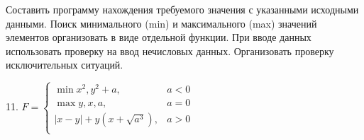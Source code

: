 Составить программу нахождения требуемого значения с указанными 
исходными данными. Поиск минимального (min) и максимального (max)
значений элементов организовать в виде отдельной функции.
При вводе данных использовать проверку на ввод нечисловых данных.
Организовать проверку исключительных ситуаций.

11.
$ 
	F = \begin{cases} 
		\min{x^2, y^2} + a,  & a < 0 \\
		\max{y, x, a},		 & a = 0 \\
		\lvert x - y \rvert + y(x + \sqrt{a^3}), & a > 0 \\
	\end{cases}
$

